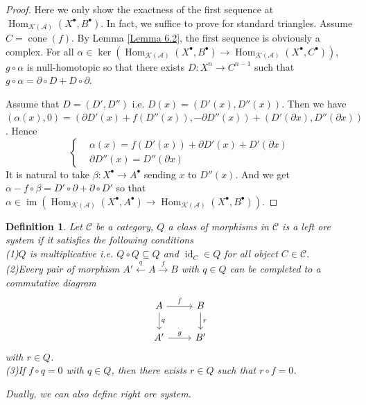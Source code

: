 \documentclass{ctexart}
\newtheorem{definition}{Definition}[section]
\renewcommand{\hom}{\operatorname{Hom}}
\newcommand{\im}{\operatorname{im}}
\newcommand{\identity}{\operatorname{id}}
\newcommand{\cone}{\operatorname{cone}}
\begin{document}
\vspace{-\baselineskip} %
\vspace{-\baselineskip} %
\begin{proof}
    Here we only show the exactness of the first sequence at $\hom_{\mathcal{K}(\mathscr{A})}(X^{\bullet}, B^{\bullet})$.
    In fact, we suffice to prove for standard triangles.
    Assume $C = \cone(f)$.
    By Lemma \ref{Lemma 6.2}, the first sequence is obviously a complex.
    For all $\alpha\in \ker (\hom_{\mathcal{K}(\mathscr{A})}(X^{\bullet}, B^{\bullet}) \rightarrow \hom_{\mathcal{K}(\mathscr{A})}(X^{\bullet}, C^{\bullet}))$,
    $g \circ \alpha$ is null-homotopic so that there exists $D: X^{n} \rightarrow C^{n - 1}$ such that $g \circ \alpha = \partial \circ D + D \circ \partial$.
    \par
    Assume that $D = (D', D'')$ i.e. $D(x) = (D'(x), D''(x))$.
    Then we have $(\alpha(x), 0) = (\partial D'(x) + f(D''(x)), -\partial D''(x)) + (D'(\partial x), D''(\partial x))$.
    Hence
    \begin{equation}
        \left\{
            \begin{aligned}
                & \alpha(x) = f(D'(x)) + \partial D'(x) + D'(\partial x) \\
                & \partial D''(x) = D''(\partial x)
            \end{aligned}
        \right.
    \end{equation}
    It is natural to take $\beta: X^{\bullet} \rightarrow A^{\bullet}$ sending $x$ to $D''(x)$.
    And we get $\alpha - f \circ \beta = D' \circ \partial + \partial \circ D'$ so that $\alpha\in \im (\hom_{\mathcal{K}(\mathscr{A})}(X^{\bullet}, A^{\bullet}) \rightarrow \hom_{\mathcal{K}(\mathscr{A})}(X^{\bullet}, B^{\bullet}))$.
\end{proof}
\begin{definition}
    Let $\mathscr{C}$ be a category, $Q$ a class of morphisms in $\mathscr{C}$ is a left ore system if it satisfies the following conditions \\
    (1)$Q$ is multiplicative i.e. $Q \circ Q \subseteq Q$ and $\identity_{C}\in Q$ for all object $C\in \mathscr{C}$. \\
    (2)Every pair of morphism $A' \overset{q}{\leftarrow} A \overset{f}{\rightarrow} B$ with $q\in Q$ can be completed to a commutative diagram
    \begin{equation}
        \begin{tikzcd}
            A \arrow[r, "f"] \arrow[d, "q"] &
            B \arrow[d, "r"] \\
            A' \arrow[r, "g"] &
            B'
        \end{tikzcd}
    \end{equation}
    with $r\in Q$. \\
    (3)If $f \circ q = 0$ with $q\in Q$, then there exists $r\in Q$ such that $r \circ f = 0$.
    \par
    Dually, we can also define right ore system.
\end{definition}
\end{document}
